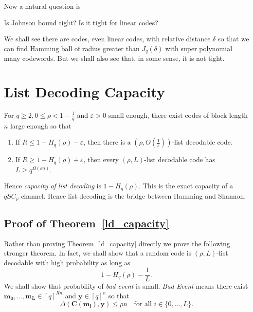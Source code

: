 	
	Now a natural question is 
	\begin{question}
		Is Johnson bound tight? Is it tight for linear codes?
	\end{question}
	
	We shall see there are codes, even linear codes, with relative distance $\delta$ so that we can find Hamming ball of radius greater than $J_q(\delta)$ with super polynomial many codewords. But we shall also see that, in some sense, it is not tight. 
	
	\section{List Decoding Capacity}
	
	\begin{theorem}[]
		\label{ld_capacity}
		For $q\geq2, 0\leq \rho < 1 - \frac{1}{q}$ and $\varepsilon>0$ small enough, there exist codes of block length $n$ large enough so that 
		\begin{enumerate}[1.]
			\item If $R\leq 1 - H_q(\rho) - \varepsilon$, then there is a $(\rho, O(\frac{1}{\varepsilon}))$-list decodable code.
			\item If $R\geq 1 - H_q(\rho) + \varepsilon$, then every $(\rho, L)$-list decodable code has $L\geq q^{\Omega(\varepsilon n)}$.
		\end{enumerate}  
	\end{theorem}
	
	Hence \emph{capacity of list decoding} is $1 - H_q(\rho)$. This is the exact capacity of a $qSC_{\rho}$ channel. Hence list decoding is the bridge between Hamming and Shannon.
	
	\subsection*{Proof of Theorem~\ref{ld_capacity}}
	Rather than proving Theorem~\ref{ld_capacity} directly we prove the following  stronger theorem. In fact, we shall show that a random code is $(\rho, L)$-list decodable with high probability as long as 
	\[
	1 - H_q(\rho) - \frac{1}{L}.
	\]
	We shall show that probability of \emph{bad event} is small. \emph{Bad Event} means there exist $\mathbf{m_0},\ldots,\mathbf{m_L}\in [q]^{Rn}$ and $\mathbf{y}\in[q]^n$ so that 
	\[
	\Delta(\mathbf{C(m_i)}, \mathbf{y}) \leq \rho n \quad \text{for all $i\in \{0,\ldots,L\}$}.
	\]
	
